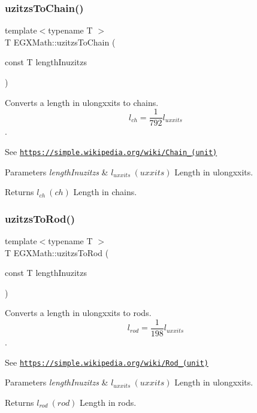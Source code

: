 \subsubsection{\texorpdfstring{uzitzs\+To\+Chain()}{uzitzsToChain()}}
{\footnotesize\ttfamily template$<$typename T $>$ \\
T E\+G\+X\+Math\+::uzitzs\+To\+Chain (\begin{DoxyParamCaption}\item[{const T}]{length\+Inuzitzs }\end{DoxyParamCaption})}



Converts a length in ulongxxits to chains. \[ l_{ch}= \frac{1}{792} l_{uxxits} \]. 

See \href{https://simple.wikipedia.org/wiki/Chain_(unit)}{\tt https\+://simple.\+wikipedia.\+org/wiki/\+Chain\+\_\+(unit)} 
\begin{DoxyParams}{Parameters}
{\em length\+Inuzitzs} & $ l_{uxxits}\ (uxxits)$ Length in ulongxxits. \\
\hline
\end{DoxyParams}
\begin{DoxyReturn}{Returns}
$ l_{ch}\ (ch)$ Length in chains. 
\end{DoxyReturn}
\mbox{\label{group___e_g_x_math-_conversions-_length_conversions-uzitzs-_surveyors_gaf6062ab067930d296074de9e8301871d}} 
\subsubsection{\texorpdfstring{uzitzs\+To\+Rod()}{uzitzsToRod()}}
{\footnotesize\ttfamily template$<$typename T $>$ \\
T E\+G\+X\+Math\+::uzitzs\+To\+Rod (\begin{DoxyParamCaption}\item[{const T}]{length\+Inuzitzs }\end{DoxyParamCaption})}



Converts a length in ulongxxits to rods. \[ l_{rod}= \frac{1}{198} l_{uxxits} \]. 

See \href{https://simple.wikipedia.org/wiki/Rod_(unit)}{\tt https\+://simple.\+wikipedia.\+org/wiki/\+Rod\+\_\+(unit)} 
\begin{DoxyParams}{Parameters}
{\em length\+Inuzitzs} & $ l_{uxxits}\ (uxxits)$ Length in ulongxxits. \\
\hline
\end{DoxyParams}
\begin{DoxyReturn}{Returns}
$ l_{rod}\ (rod)$ Length in rods. 
\end{DoxyReturn}
